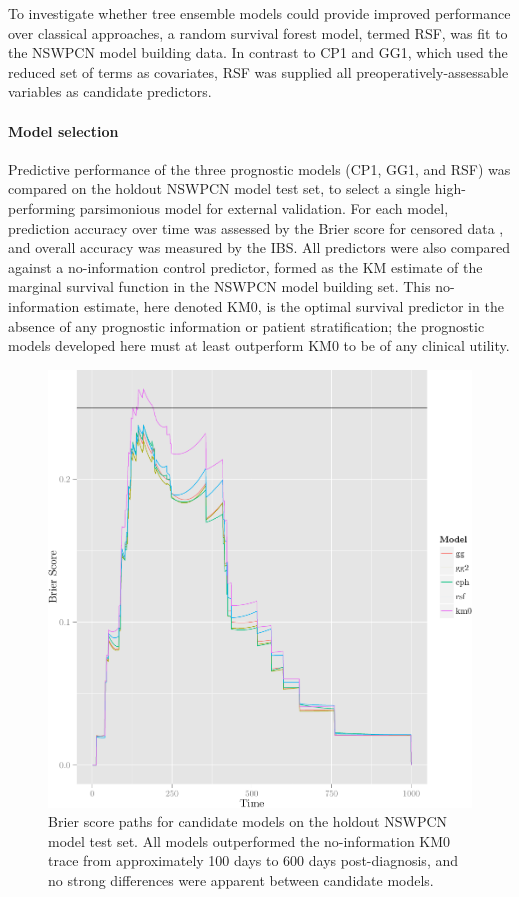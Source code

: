 \documentclass[dissertation.tex]{subfiles}
\begin{document}
To investigate whether tree ensemble models could provide improved performance over classical approaches, a random survival forest model, termed RSF, was fit to the \gls{NSWPCN} model building data.  In contrast to CP1 and GG1, which used the reduced set of terms as covariates, RSF was supplied all preoperatively-assessable variables as candidate predictors.

\paragraph{Model selection}
Predictive performance of the three prognostic models (CP1, GG1, and RSF) was compared on the holdout \gls{NSWPCN} model test set, to select a single high-performing parsimonious model for external validation.  For each model, prediction accuracy over time was assessed by the Brier score for censored data \cite{Graf1999}, and overall accuracy was measured by the \gls{IBS}.  All predictors were also compared against a no-information control predictor, formed as the \gls{KM} estimate of the marginal survival function in the \gls{NSWPCN} model building set.  This no-information estimate, here denoted KM0, is the optimal survival predictor in the absence of any prognostic information or patient stratification; the prognostic models developed here must at least outperform KM0 to be of any clinical utility.

\begin{figure}
\centering
  \includegraphics[width=.7\linewidth]{analysis/nomogram/figure/05-model-selection-bs-paths-1}
  \caption[Brier score paths for candidate models on holdout data]{Brier score paths for candidate models on the holdout \gls{NSWPCN} model test set.  All models outperformed the no-information KM0 trace from approximately 100 days to 600 days post-diagnosis, and no strong differences were apparent between candidate models.}
\label{fig:nomo-brier-paths}
\end{figure}
\end{document}
